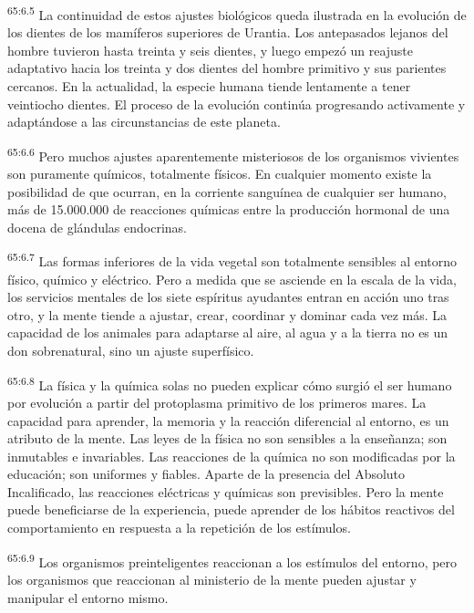 \par
\textsuperscript{65:6.5} La continuidad de estos ajustes biológicos queda ilustrada en la evolución de los dientes de los mamíferos superiores de Urantia. Los antepasados lejanos del hombre tuvieron hasta treinta y seis dientes, y luego empezó un reajuste adaptativo hacia los treinta y dos dientes del hombre primitivo y sus parientes cercanos. En la actualidad, la especie humana tiende lentamente a tener veintiocho dientes. El proceso de la evolución continúa progresando activamente y adaptándose a las circunstancias de este planeta.

\par
\textsuperscript{65:6.6} Pero muchos ajustes aparentemente misteriosos de los organismos vivientes son puramente químicos, totalmente físicos. En cualquier momento existe la posibilidad de que ocurran, en la corriente sanguínea de cualquier ser humano, más de 15.000.000 de reacciones químicas entre la producción hormonal de una docena de glándulas endocrinas.

\par
\textsuperscript{65:6.7} Las formas inferiores de la vida vegetal son totalmente sensibles al entorno físico, químico y eléctrico. Pero a medida que se asciende en la escala de la vida, los servicios mentales de los siete espíritus ayudantes entran en acción uno tras otro, y la mente tiende a ajustar, crear, coordinar y dominar cada vez más. La capacidad de los animales para adaptarse al aire, al agua y a la tierra no es un don sobrenatural, sino un ajuste superfísico.

\par
\textsuperscript{65:6.8} La física y la química solas no pueden explicar cómo surgió el ser humano por evolución a partir del protoplasma primitivo de los primeros mares. La capacidad para aprender, la memoria y la reacción diferencial al entorno, es un atributo de la mente. Las leyes de la física no son sensibles a la enseñanza; son inmutables e invariables. Las reacciones de la química no son modificadas por la educación; son uniformes y fiables. Aparte de la presencia del Absoluto Incalificado, las reacciones eléctricas y químicas son previsibles. Pero la mente puede beneficiarse de la experiencia, puede aprender de los hábitos reactivos del comportamiento en respuesta a la repetición de los estímulos.

\par
\textsuperscript{65:6.9} Los organismos preinteligentes reaccionan a los estímulos del entorno, pero los organismos que reaccionan al ministerio de la mente pueden ajustar y manipular el entorno mismo.

